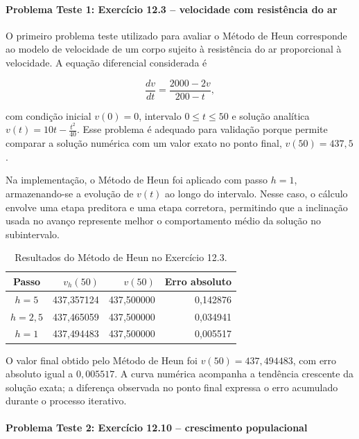 \paragraph{Problema Teste 1: Exercício 12.3 -- velocidade com resistência do ar}

O primeiro problema teste utilizado para avaliar o Método de Heun corresponde ao modelo de velocidade de um corpo sujeito à resistência do ar proporcional à velocidade. A equação diferencial considerada é

\[
    \frac{dv}{dt}=\frac{2000-2v}{200-t},
\]

com condição inicial \(v(0)=0\), intervalo \(0\leq t\leq 50\) e solução analítica \(v(t)=10t-\frac{t^2}{40}\). Esse problema é adequado para validação porque permite comparar a solução numérica com um valor exato no ponto final, \(v(50)=437{,}5\).

Na implementação, o Método de Heun foi aplicado com passo \(h=1\), armazenando-se a evolução de \(v(t)\) ao longo do intervalo. Nesse caso, o cálculo envolve uma etapa preditora e uma etapa corretora, permitindo que a inclinação usada no avanço represente melhor o comportamento médio da solução no subintervalo.

\begin{table}[H]
    \centering
    \caption{Resultados do Método de Heun no Exercício 12.3.}
    \begin{tabular}{c|r|r|r}
        \textbf{Passo} & \textbf{\(v_h(50)\)} & \textbf{\(v(50)\)} & \textbf{Erro absoluto} \\
        \hline
        \(h=5\) & 437{,}357124 & 437{,}500000 & 0{,}142876 \\
        \(h=2{,}5\) & 437{,}465059 & 437{,}500000 & 0{,}034941 \\
        \(h=1\) & 437{,}494483 & 437{,}500000 & 0{,}005517 \\
    \end{tabular}
\end{table}

O valor final obtido pelo Método de Heun foi \(v(50)=437{,}494483\), com erro absoluto igual a \(0{,}005517\). A curva numérica acompanha a tendência crescente da solução exata; a diferença observada no ponto final expressa o erro acumulado durante o processo iterativo.

\paragraph{Problema Teste 2: Exercício 12.10 -- crescimento populacional}

